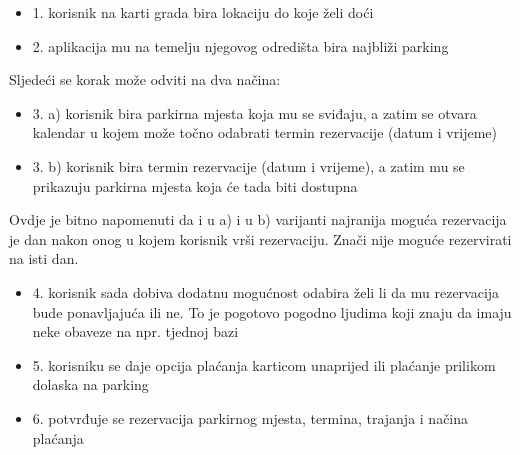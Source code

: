 \documentclass{article} %
\begin{document}
	 \hspace{1cm}{\Large 	Prilikom prve registracije potrebno je potvrditi svoje podatke preko poruke poslane na prethodno unesenu e-mail adresu. Za prijavu su potrebni samo korisničko ime i lozinka. Najvažnija dodatna mogućnost koju aplikacija nudi prijavljenim korisnicima je pregled dostupnih parkirnih mjesta u realnom vremenu. Puni postupak rezervacije parkirnog mjesta izgleda ovako:}
	\begin{itemize}
		\item[] {\Large 1. korisnik na karti grada bira lokaciju do koje želi doći}
		\item[] {\Large 2. aplikacija mu na temelju njegovog odredišta bira najbliži parking}
	\end{itemize}
	{\Large Sljedeći se korak može odviti na dva načina:}
	\begin{itemize}
		\item[] {\Large 3. a) korisnik bira parkirna mjesta koja mu se sviđaju, a zatim se otvara kalendar u kojem može točno odabrati termin rezervacije (datum i vrijeme)}
		\item[] {\Large 3. b) korisnik bira termin rezervacije (datum i vrijeme), a zatim mu se prikazuju parkirna mjesta koja će tada biti dostupna}
	\end{itemize}
	{\Large Ovdje je bitno napomenuti da i u a) i u b) varijanti najranija moguća rezervacija je dan nakon onog u kojem korisnik vrši rezervaciju. Znači nije moguće rezervirati na isti dan.}
	\begin{itemize}
		\item[] {\Large 4. korisnik sada dobiva dodatnu mogućnost odabira želi li da mu rezervacija bude ponavljajuća ili ne. To je pogotovo pogodno ljudima koji znaju da imaju neke obaveze na npr. tjednoj bazi}
		\item[] {\Large 5. korisniku se daje opcija plaćanja karticom unaprijed ili plaćanje prilikom dolaska na parking}
		\item[] {\Large 6. potvrđuje se rezervacija parkirnog mjesta, termina, trajanja i načina plaćanja\\ \\ }
	\end{itemize}
	

	\hspace{1cm}{\Large Korisniku se pruža mogućnost plaćanja direktnim prijenosom sredstava s kartice ili uplaćivanjem novca u novčanik unutar aplikacije nakon kojeg se sredstva mogu koristiti u bilo kojem trenutku. Drugi način štedi vrijeme jer nije potrebno unositi podatke o kartici i vršiti potvrde prilikom svake transakcije.\\ }
	
\end{document}
